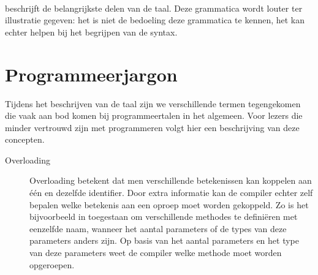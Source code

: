 \paragraph{}
 beschrijft de belangrijkste delen van de \tvhdl{} taal. Deze grammatica wordt louter ter illustratie gegeven: het is niet de bedoeling deze grammatica te kennen, het kan echter helpen bij het begrijpen van de \tvhdl{} syntax.

% 
\section{Programmeerjargon}
Tijdens het beschrijven van de \tvhdl{} taal zijn we verschillende termen tegengekomen die vaak aan bod komen bij programmeertalen in het algemeen. Voor lezers die minder vertrouwd zijn met programmeren volgt hier een beschrijving van deze concepten.

\begin{description}
 \item [Overloading] Overloading betekent dat men verschillende betekenissen kan koppelen aan \'e\'en en dezelfde identifier. Door extra informatie kan de compiler echter zelf bepalen welke betekenis aan een oproep moet worden gekoppeld. Zo is het bijvoorbeeld in \tjava{} toegestaan om verschillende methodes te defini\"eren met eenzelfde naam, wanneer het aantal parameters of de types van deze parameters anders zijn. Op basis van het aantal parameters en het type van deze parameters weet de \tjava{} compiler welke methode moet worden opgeroepen.
\end{description}